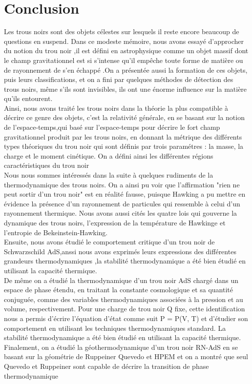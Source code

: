 \documentclass[12pt,  a4paper, openright]{report} %
\begin{document}
\section*{Conclusion}
Les trous noirs sont des objets célestes sur lesquels il reste encore beaucoup de questions en suspend. Dans ce modeste mémoire, nous avons essayé d'approcher du notion du trou noir ,il est défini en astrophysique  comme un objet massif dont le champ gravitationnel est si
s'intense qu'il empêche toute forme de matière ou de rayonnement de s'en échappé .On a présentée aussi la formation de ces objets, puis leurs classifications, et on a fini par quelques
méthodes de détection des trous noirs, même s'ils sont invisibles, ils ont une énorme influence sur la matière qu'ils entourent.\\
 Ainsi, nous avons traité les trous noirs dans la
théorie la plus compatible à décrire ce genre des objets, c'est la relativité générale, en se
basant sur la notion de l'espace-temps,qui basé sur  l’espace-temps pour décrire le fort champ gravitationnel produit
par les trous noirs, en donnant la métrique des différents types théoriques du trou noir qui sont
définis par trois paramétres : la masse, la charge et le moment cinétique. On a défini ainsi les
différentes régions caractéristiques du trou noir \\
Nous nous sommes intéressés dans la suite à quelques rudiments de la thermodynamique des
trous noirs. On a ainsi pu voir que l’affirmation "rien ne peut sortir d’un trou noir" est en réalité
fausse, puisque Hawking a pu mettre en évidence la présence d’un rayonnement de particules
qui ressemble à celui d'un rayonnement thermique. Nous avons aussi cités les quatre lois qui gouverne la dynamique des trous noirs, l’expression
de la température de Hawkinge et l’entropie de Bekeinstein-Hawking.\\
Ensuite, nous avons étudié le comportement critique d'un trou noir de Schwarzschild AdS,anssi nous avons exprimés leurs expressions des
différentes grandeurs thermodynamiques ,la stabilité thermodynamique a été bien étudié en utilisant la capacité thermique.\\
De m\^{e}me on a étudié la thermodynamique d’un trou noir AdS chargé dans un espace de phase
étendu, en traitant la constante cosmologique et sa quantité conjuguée, comme des variables thermodynamiques associées à la pression et au volume, respectivement. Pour une
charge de trou noir Q fixe, cette identification nous a permis d’écrire l’équation d’état
comme suit P = P(V, T) et d’étudier son comportement en utilisant les techniques thermodynamiques standard. La stabilité thermodynamique a été bien étudié en utilisant la
capacité thermique.
Finalement, on a étudié la géothermodynamique d’un trou noir RN-AdS en se basant
sur la géométrie de Ruppeiner Quevedo et HPEM et on a montré que seul Quevedo et
Ruppeiner sont capable de décrire la transition de phase thermodynamique
\end{document}
